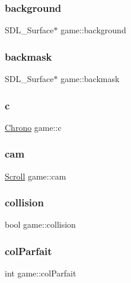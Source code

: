 \subsubsection{\texorpdfstring{background}{background}}
{\footnotesize\ttfamily S\+D\+L\+\_\+\+Surface$\ast$ game\+::background}

\mbox{\label{structgame_a16cce3e91de3f657879f73af44aa7a25}} 
\subsubsection{\texorpdfstring{backmask}{backmask}}
{\footnotesize\ttfamily S\+D\+L\+\_\+\+Surface$\ast$ game\+::backmask}

\mbox{\label{structgame_acbb63e13f36a1a563e71f3c5585d535b}} 
\subsubsection{\texorpdfstring{c}{c}}
{\footnotesize\ttfamily \hyperlink{structChrono}{Chrono} game\+::c}

\mbox{\label{structgame_a049a316142be533b4ac476db39e73b18}} 
\subsubsection{\texorpdfstring{cam}{cam}}
{\footnotesize\ttfamily \hyperlink{structScroll}{Scroll} game\+::cam}

\mbox{\label{structgame_a054464e92ab87658ffa7935942e5c4ed}} 
\subsubsection{\texorpdfstring{collision}{collision}}
{\footnotesize\ttfamily bool game\+::collision}

\mbox{\label{structgame_a9c565166ec535e0abed46299c525a607}} 
\subsubsection{\texorpdfstring{col\+Parfait}{colParfait}}
{\footnotesize\ttfamily int game\+::col\+Parfait}

